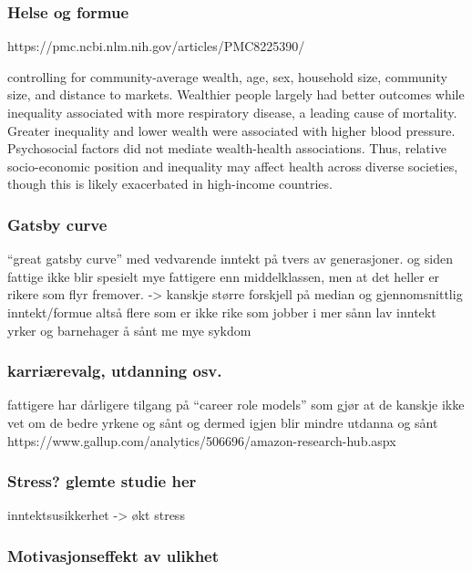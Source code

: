 \documentclass[
  11pt,
  a4paper,
  DIV=11,
  numbers=noendperiod]{scrartcl}
\begin{document}
\subsubsection{Helse og formue}\label{helse-og-formue}

https://pmc.ncbi.nlm.nih.gov/articles/PMC8225390/

controlling for community-average wealth, age, sex, household size,
community size, and distance to markets. Wealthier people largely had
better outcomes while inequality associated with more respiratory
disease, a leading cause of mortality. Greater inequality and lower
wealth were associated with higher blood pressure. Psychosocial factors
did not mediate wealth-health associations. Thus, relative
socio-economic position and inequality may affect health across diverse
societies, though this is likely exacerbated in high-income countries.

\subsubsection{Gatsby curve}\label{gatsby-curve}

``great gatsby curve'' med vedvarende inntekt på tvers av generasjoner.
og siden fattige ikke blir spesielt mye fattigere enn middelklassen, men
at det heller er rikere som flyr fremover. -\textgreater{} kanskje
større forskjell på median og gjennomsnittlig inntekt/formue altså flere
som er ikke rike som jobber i mer sånn lav inntekt yrker og barnehager å
sånt me mye sykdom

\subsubsection{karriærevalg, utdanning
osv.}\label{karriuxe6revalg-utdanning-osv.}

fattigere har dårligere tilgang på ``career role models'' som gjør at de
kanskje ikke vet om de bedre yrkene og sånt og dermed igjen blir mindre
utdanna og sånt
https://www.gallup.com/analytics/506696/amazon-research-hub.aspx

\subsubsection{Stress? glemte studie
her}\label{stress-glemte-studie-her}

inntektsusikkerhet -\textgreater{} økt stress

\subsubsection{Motivasjonseffekt av
ulikhet}\label{motivasjonseffekt-av-ulikhet}
\end{document}
